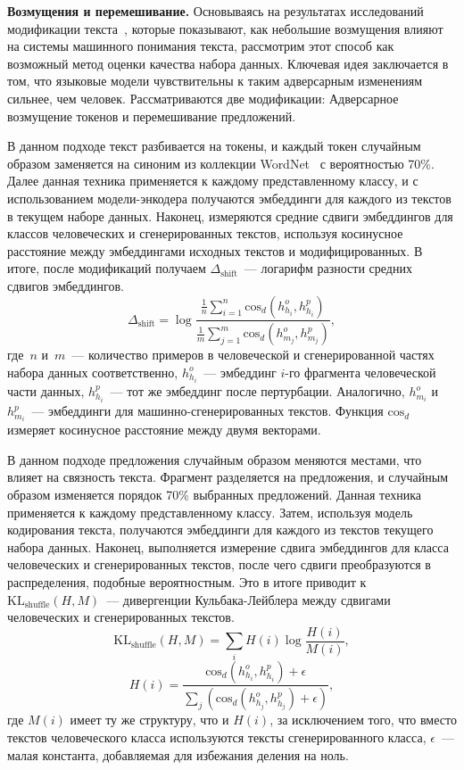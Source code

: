 \textbf{Возмущения и перемешивание.} Основываясь на результатах исследований модификации текста~\cite{sadasivan2024can, mitchell2023detectgpt}, которые показывают, как небольшие возмущения влияют на системы машинного понимания текста, рассмотрим этот способ как возможный метод оценки качества набора данных.
Ключевая идея заключается в том, что языковые модели чувствительны к таким адверсарным изменениям сильнее, чем человек.
Рассматриваются две модификации: Адверсарное возмущение токенов и перемешивание предложений.

В данном подходе текст разбивается на токены, и каждый токен случайным образом заменяется на синоним из коллекции WordNet~\cite{wordnet} с вероятностью 70\%.
Далее данная техника применяется к каждому представленному классу, и с использованием модели-энкодера получаются эмбеддинги для каждого из текстов в текущем наборе данных.
Наконец, измеряются средние сдвиги эмбеддингов для классов человеческих и сгенерированных текстов, используя косинусное расстояние между эмбеддингами исходных текстов и модифицированных.
В итоге, после модификаций получаем $\Delta_{\text{shift}}$~--- логарифм разности средних сдвигов эмбеддингов.
\[
    \Delta_{\text{shift}} = \log \frac{{\frac{1}{n} \sum_{i=1}^{n} \text{cos}_d(h_{h_i}^o, h_{h_i}^p)}}{{\frac{1}{m}\sum_{j=1}^{m} \text{cos}_d(h_{m_j}^o, h_{m_j}^p)}},
\]
где~$n$ и~$m$~--- количество примеров в человеческой и сгенерированной частях набора данных соответственно, $h_{h_i}^o$~--- эмбеддинг $i$-го фрагмента человеческой части данных, $h_{h_i}^p$~--- тот же эмбеддинг после пертурбации.
Аналогично, $h_{m_i}^o$ и $h_{m_i}^p$~--- эмбеддинги для машинно-сгенерированных текстов.
Функция $\text{cos}_d$ измеряет косинусное расстояние между двумя векторами.

В данном подходе предложения случайным образом меняются местами, что влияет на связность текста.
Фрагмент разделяется на предложения, и случайным образом изменяется порядок 70\% выбранных предложений.
Данная техника применяется к каждому представленному классу.
Затем, используя модель кодирования текста, получаются эмбеддинги для каждого из текстов текущего набора данных.
Наконец, выполняется измерение сдвига эмбеддингов для класса человеческих и сгенерированных текстов, после чего сдвиги преобразуются в распределения, подобные вероятностным.
Это в итоге приводит к~$\text{KL}_{\text{shuffle}}(H,M)$~--- дивергенции Кульбака-Лейблера между сдвигами человеческих и сгенерированных текстов.
\[
    \text{KL}_{\text{shuffle}}(H,M)= \sum_{i} H(i) \log \frac{H(i)}{M(i)},
\]
\[
    H(i) = \frac{\text{cos}_d(h_{h_i}^o, h_{h_i}^p) + \epsilon}{\sum_j \left(\text{cos}_d(h_{h_j}^o, h_{h_j}^p) + \epsilon\right)},
\]
где $M(i)$ имеет ту же структуру, что и $H(i)$, за исключением того, что вместо текстов человеческого класса используются тексты сгенерированного класса, $\epsilon$~--- малая константа, добавляемая для избежания деления на ноль.

